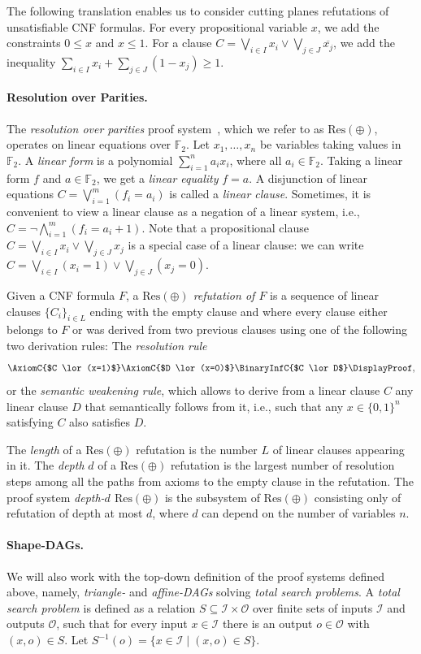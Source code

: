 \documentclass[10pt,a4paper]{article}
\theoremstyle{definition}
\theoremstyle{remark}
\theoremstyle{example}
\theoremstyle{plain}
\newcommand{\prflength}{L}
\newcommand{\ResLin}{\textrm{Res}(\oplus)}
\newcommand{\F}{\mathbb{F}}
\newcommand{\myparagraph}[1]{\paragraph{#1}}
\begin{document}
The following translation enables us to consider cutting planes refutations of unsatisfiable CNF formulas.  
For every propositional variable $x$, we add the constraints $0\leq x$ and $x\leq 1$. For a clause $C=\bigvee_{i\in I}x_i\lor\bigvee_{j\in J} \overline{x_j}$, we add the inequality $\sum_{i\in I} x_i + \sum_{j\in J} (1-x_j) \geq 1$.

\myparagraph{Resolution over Parities.} 
The \emph{resolution over parities} proof system~\cite{IS20ResLin}, which we refer to as $\ResLin$, operates on linear equations over $\F_2$.
Let $x_1, \dots, x_n$ be variables taking values in $\F_2$. A \emph{linear form} is a polynomial $\sum_{i=1}^n a_ix_i$, where all $a_i\in \F_2$. Taking a linear form $f$ and $a\in \F_2$, we get a \emph{linear equality} $f=a$. 
A disjunction of linear equations $C=\bigvee_{i=1}^m (f_i=a_i)$ is called a \emph{linear clause}. Sometimes, it is convenient to view a linear clause as a negation of a linear system, i.e., $C=\lnot \bigwedge_{i=1}^m (f_i = a_i+1)$. 
Note that a propositional clause $C=\bigvee_{i\in I}x_i\lor\bigvee_{j\in J}x_j$ is a special case of a linear clause: we can write $C=\bigvee_{i\in I} (x_i=1) \lor \bigvee_{j\in J}(x_j=0)$.

Given a CNF formula $F$, a \emph{$\ResLin$ refutation 
of $F$} is a sequence of linear clauses $\{C_i\}_{i\in\prflength}$ ending with the empty clause and where every clause either belongs to $F$ or was derived from two previous clauses using one of the following two derivation rules:  The \emph{resolution rule}
\begin{equation*}
  \AxiomC{$C \lor (x=1)$}
  \AxiomC{$D \lor (x=0)$}
  \BinaryInfC{$C \lor D$}
  \DisplayProof ,
\end{equation*}
or the \emph{semantic weakening rule}, which allows to derive from a linear clause $C$ any linear clause $D$ that semantically follows from it, i.e., such that any $x\in \{0,1\}^n$ satisfying $C$ also satisfies $D$.  

The \emph{length} of a $\ResLin$ refutation is the number $\prflength$ of linear clauses appearing in it. The \emph{depth} $d$ of a $\ResLin$ refutation is the largest number of resolution steps among all the paths from axioms to the empty clause in the refutation.
The proof system \emph{depth-$d$ $\ResLin$} is the subsystem of $\ResLin$ consisting only of refutation of depth at most $d$, where $d$ can depend on the number of variables $n$.

\myparagraph{Shape-DAGs.}
We will also work with the top-down definition of the proof systems defined above, namely, \emph{triangle-} and \emph{affine-DAGs} solving \emph{total search problems}. 
A \emph{total search problem} is defined as a relation $S\subseteq \mathcal{I} \times \mathcal{O}$ over finite sets of inputs $\mathcal{I}$ and outputs $\mathcal{O}$, such that for every input $x\in \mathcal{I}$ there is an output $o\in \mathcal{O}$ with $(x,o)\in S$. Let $S^{-1}(o)= \{x\in \mathcal{I} \mid (x,o) \in S \}$.
\end{document}
